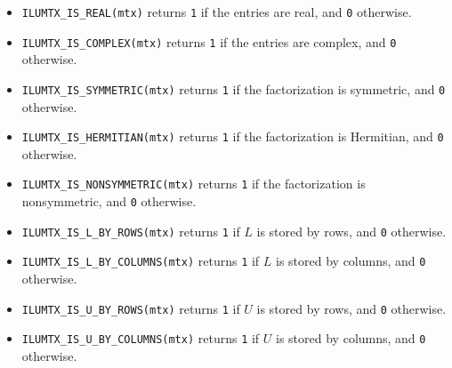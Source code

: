 \begin{itemize}
\item
{\tt ILUMTX\_IS\_REAL(mtx)} returns {\tt 1} 
if the entries are real, and {\tt 0} otherwise.
\item
{\tt ILUMTX\_IS\_COMPLEX(mtx)} returns {\tt 1} 
if the entries are complex, and {\tt 0} otherwise.
\item
{\tt ILUMTX\_IS\_SYMMETRIC(mtx)} returns {\tt 1} 
if the factorization is symmetric, and {\tt 0} otherwise.
\item
{\tt ILUMTX\_IS\_HERMITIAN(mtx)} returns {\tt 1} 
if the factorization is Hermitian, and {\tt 0} otherwise.
\item
{\tt ILUMTX\_IS\_NONSYMMETRIC(mtx)} returns {\tt 1} 
if the factorization is nonsymmetric, and {\tt 0} otherwise.
\item
{\tt ILUMTX\_IS\_L\_BY\_ROWS(mtx)} returns {\tt 1} 
if $L$ is stored by rows, and {\tt 0} otherwise.
\item
{\tt ILUMTX\_IS\_L\_BY\_COLUMNS(mtx)} returns {\tt 1} 
if $L$ is stored by columns, and {\tt 0} otherwise.
\item
{\tt ILUMTX\_IS\_U\_BY\_ROWS(mtx)} returns {\tt 1} 
if $U$ is stored by rows, and {\tt 0} otherwise.
\item
{\tt ILUMTX\_IS\_U\_BY\_COLUMNS(mtx)} returns {\tt 1} 
if $U$ is stored by columns, and {\tt 0} otherwise.
\end{itemize}
